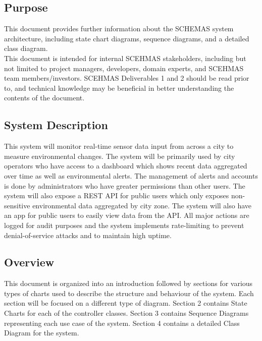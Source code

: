 \documentclass[]{article}
\begin{document}
\subsection{Purpose}
\label{sub:purpose}
This document provides further information about the SCHEMAS system architecture, including state chart diagrams, sequence diagrams, and a detailed class diagram. 
\newline \\
This document is intended for internal SCEHMAS stakeholders, including but not limited to project managers, developers, domain experts, and SCEHMAS team members/investors. SCEHMAS Deliverables 1 and 2 should be read prior to, and technical knowledge may be beneficial in better understanding the contents of the document.



\subsection{System Description}
\label{sub:system_description}
	 This system will monitor real-time sensor data input from across a city to measure environmental changes. The system will be primarily used by city operators who have access to a dashboard which shows recent data aggregated over time as well as environmental alerts. The management of alerts and accounts is done by administrators who have greater permissions than other users. The system will also expose a REST API for public users which only exposes non-sensitive environmental data aggregated by city zone. The system will also have an app for public users to easily view data from the API. All major actions are logged for audit purposes and the system implements rate-limiting to prevent denial-of-service attacks and to maintain high uptime. 

\subsection{Overview}
\label{sub:overview}
	This document is organized into an introduction followed by sections for various types of charts used to describe the structure and behaviour of the system. Each section will be focused on a different type of diagram. Section 2 contains State Charts for each of the controller classes. Section 3 contains Sequence Diagrams representing each use case of the system. Section 4 contains a detailed Class Diagram for the system. 
\end{document}
